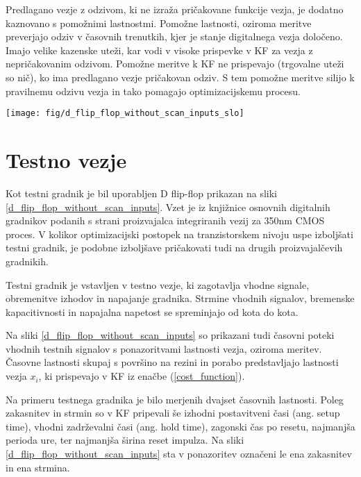 \documentclass[journal,a4paper,twoside]{template/IEEEtran}
\begin{document}
Predlagano vezje z odzivom, ki ne izraža pričakovane funkcije vezja, je dodatno kaznovano s pomožnimi lastnostmi. Pomožne lastnosti, oziroma meritve preverjajo odziv v časovnih trenutkih, kjer je stanje digitalnega vezja določeno. Imajo velike kazenske uteži, kar vodi v visoke prispevke v KF za vezja z nepričakovanim odzivom. Pomožne meritve k KF ne prispevajo (trgovalne uteži so nič), ko ima predlagano vezje pričakovan odziv. S tem pomožne meritve silijo k pravilnemu odzivu vezja in tako pomagajo optimizacijskemu procesu.

\begin{figure*}[t]
\begin{center}
\begin{minipage}[t]{12cm}
\texttt{[image: fig/d\_flip\_flop\_without\_scan\_inputs\_slo]}
\caption{D flip-flop ($d = {\rm podatek}$, $c = {\rm ura}$, $rn = {\overline {\rm reset}}$, $q = {\rm izhod}$, $qn = {\overline {\rm izhod}}$)}
\end{minipage}
\end{center}
\label{d_flip_flop_without_scan_inputs}
\end{figure*}

\section{Testno vezje}
Kot testni gradnik je bil uporabljen D flip-flop prikazan na sliki \ref{d_flip_flop_without_scan_inputs}. Vzet je iz knjižnice osnovnih digitalnih gradnikov podanih s strani proizvajalca integriranih vezij za 350nm CMOS proces. V kolikor optimizacijski postopek na tranzistorskem nivoju uspe izboljšati testni gradnik, je podobne izboljšave pričakovati tudi na drugih proizvajalčevih gradnikih.

Testni gradnik je vstavljen v testno vezje, ki zagotavlja vhodne signale, obremenitve izhodov in napajanje gradnika. Strmine vhodnih signalov, bremenske kapacitivnosti in napajalna napetost se spreminjajo od kota do kota. 

Na sliki \ref{d_flip_flop_without_scan_inputs} so prikazani tudi časovni poteki vhodnih testnih signalov s ponazoritvami lastnosti vezja, oziroma meritev. Časovne lastnosti skupaj s površino na rezini in porabo predstavljajo lastnosti vezja $x_i$, ki prispevajo v KF iz enačbe (\ref{cost_function}).

Na primeru testnega gradnika je bilo merjenih dvajset časovnih lastnosti. Poleg zakasnitev in strmin so v KF pripevali še izhodni postavitveni časi (ang. setup time), vhodni zadrževalni časi (ang. hold time), zagonski čas po resetu, najmanjša perioda ure, ter najmanjša širina reset impulza. Na sliki \ref{d_flip_flop_without_scan_inputs} sta v ponazoritev označeni le ena zakasnitev in ena strmina.
\end{document}
